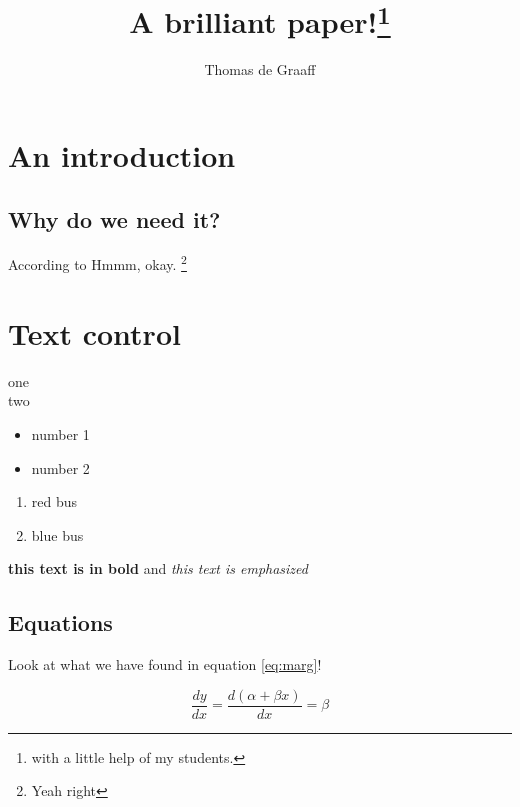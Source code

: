 \documentclass[]{article}
\title{A brilliant paper!\footnote{with a little help of my students.}}
\author{Thomas de Graaff}
\begin{document}
\maketitle

\begin{abstract}
\lipsum[1]
\end{abstract}

\section{An introduction}

\subsection{Why do we need it?}

\lipsum[2]
According to \citet{Braysy2009,Cruijssen2007, Cruijssen2007a} \lipsum[2]
Hmmm, okay. \footnote{Yeah right}

\section{Text control}

\begin{description}
	\item[one] \lipsum[1]
	\item[two] \lipsum[1]
\end{description}

\begin{itemize}
	\item number 1
	\item number 2
\end{itemize}

\begin{enumerate}
	\item red bus
	\item blue bus
\end{enumerate}

\textbf{this text is in bold} and \emph{this text is emphasized}

\subsection{Equations}

Look at what we have found in equation \ref{eq:marg}!

\begin{equation}
	\frac{dy}{dx} = \frac{d(\alpha + \beta x)}{dx} = \beta
	\label{eq:marg}
\end{equation}
\end{document}
